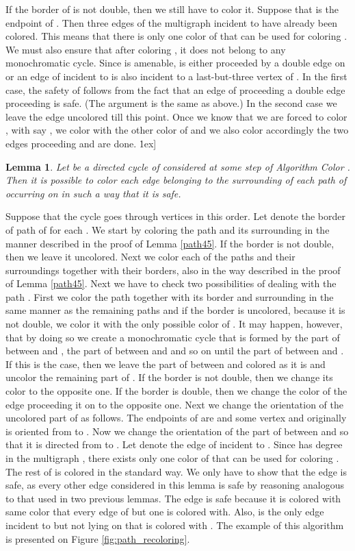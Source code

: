 \documentclass[a4, 11pt]{article}
\newcommand{\dowod}{\noindent{\bf Proof.~}}
\newcommand{\koniec}{\hfill \.1ex]}
\newcommand{\<}{\langle}
\renewcommand{\>}{\rangle}
\newtheorem{lemma}{Lemma}
\begin{document}
If the border  of  is not double, then we still have to color it. Suppose that  is the endpoint of . Then three edges of the multigraph  incident to  have already been colored. This means that there is only one color of  that can be used for coloring . We must also ensure that after coloring , it does not belong to any monochromatic cycle. Since  is amenable,  is either proceeded by a double edge on  or an edge  of  incident to  is also incident to a last-but-three vertex of . In the first case, the safety of  follows from the fact that an edge of  proceeding a double edge proceeding  is safe. (The argument is the same as above.) In the second case 
we leave the edge  uncolored till this point. Once we know that we are forced to color , with say , we color  with the other color of  and we also color accordingly the two edges proceeding  and are done.
\koniec

\begin{lemma}
\label{lemma:coloring_cycle_of_paths}
Let  be a directed cycle of  considered at some step of Algorithm Color . Then it is possible to color each edge belonging to the surrounding of each path of  occurring on  in such a way that it is safe.
\end{lemma}
\dowod
Suppose that the cycle  goes through vertices  in this order. Let  denote the border of path  of  for each .  We start by coloring the path  and its surrounding in the manner described in the proof of Lemma \ref{path45}. If the border  is not double, then we leave it uncolored. Next we color each of the paths  and their surroundings together with their borders, also in the way described in the proof of Lemma \ref{path45}. Next we have to check two possibilities of dealing with the path . First we  color the path  together with  its border and surrounding in the same manner
as the remaining paths  and if the border  is uncolored, because it is not double, we color it with the only possible color of . It may happen, however, that by doing so we create a monochromatic cycle  that is formed by the part of  between 
 and , the part of  between  and  and so on until the part of  between  and . If this is the case, then we leave the part of  between  and  colored as it is and uncolor the remaining part of  . If the border 
is not double, then we change its color to the opposite one. If the border  is double, then we change the color of the edge proceeding it on  to the opposite one. Next we change the orientation of the uncolored part of  as follows. The endpoints of  are  and some vertex  and originally  is oriented from  to . Now we change the orientation of the part  of  between  and  so that it is directed from  to .  Let  denote the edge of  incident to .  Since  has degree  in the multigraph , there exists only one color  of  that can be used for coloring . The rest of  is colored in the standard way. We only have to show that the edge  is safe, as every other edge considered in this lemma is safe by reasoning analogous to that used in two previous lemmas. The edge  is safe because it is colored with same color  that every edge of  but one is colored with. Also,  is the only edge incident to  but not lying on  that is colored with . The example of this algorithm is presented on Figure \ref{fig:path_recoloring}.
\end{document}
